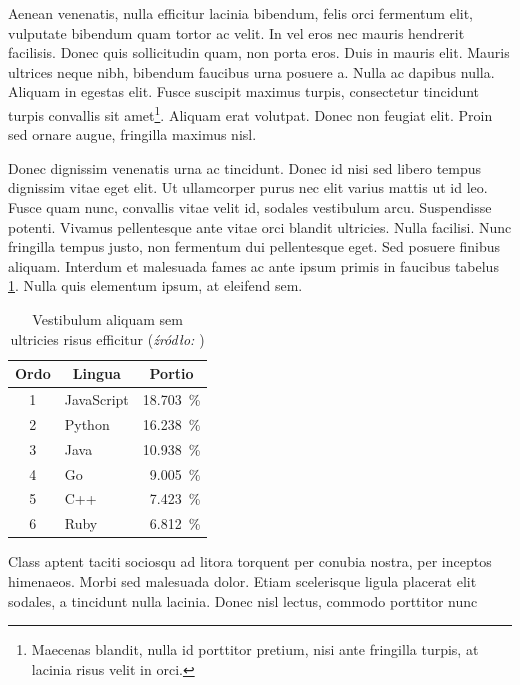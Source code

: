 \documentclass[polish,engineering]{wizthesis}
\begin{document}
Aenean venenatis, nulla efficitur lacinia bibendum, felis orci fermentum elit,
vulputate bibendum quam tortor ac velit. In vel eros nec mauris hendrerit
facilisis. Donec quis sollicitudin quam, non porta eros. Duis in mauris elit.
Mauris ultrices neque nibh, bibendum faucibus urna posuere a. Nulla ac dapibus
nulla. Aliquam in egestas elit. Fusce suscipit maximus turpis, consectetur
tincidunt turpis convallis sit amet\footnote{Maecenas blandit, nulla id
porttitor pretium, nisi ante fringilla turpis, at lacinia risus velit in orci.}.
Aliquam erat volutpat. Donec non feugiat elit. Proin sed ornare augue, fringilla
maximus nisl.

Donec dignissim venenatis urna ac tincidunt. Donec id nisi sed libero tempus
dignissim vitae eget elit. Ut ullamcorper purus nec elit varius mattis ut id
leo. Fusce quam nunc, convallis vitae velit id, sodales vestibulum arcu.
Suspendisse potenti. Vivamus pellentesque ante vitae orci blandit ultricies.
Nulla facilisi. Nunc fringilla tempus justo, non fermentum dui pellentesque
eget. Sed posuere finibus aliquam. Interdum et malesuada fames ac ante ipsum
primis in faucibus tabelus \ref{tab:jezyki}. Nulla quis elementum ipsum, at
eleifend sem.
\begin{table}[ht]
  \centering
  \caption{Vestibulum aliquam sem ultricies risus efficitur
  (\textit{źródło: \cite{latexcompanion}})}
  \label{tab:jezyki}
  \begin{tabular}{|c|l|r|}
    \hline
    Ordo & \multicolumn{1}{c|}{Lingua} & \multicolumn{1}{c|}{Portio} \\ \hline
    1    & JavaScript                  & \SI{18.703}{\percent}       \\ \hline
    2    & Python                      & \SI{16.238}{\percent}       \\ \hline
    3    & Java                        & \SI{10.938}{\percent}       \\ \hline
    4    & Go                          & \SI{9.005}{\percent}        \\ \hline
    5    & C++                         & \SI{7.423}{\percent}        \\ \hline
    6    & Ruby                        & \SI{6.812}{\percent}        \\ \hline
  \end{tabular}
\end{table}
Class aptent taciti sociosqu ad litora torquent per conubia nostra, per inceptos
himenaeos. Morbi sed malesuada dolor. Etiam scelerisque ligula placerat elit
sodales, a tincidunt nulla lacinia. Donec nisl lectus, commodo porttitor nunc
\end{document}
